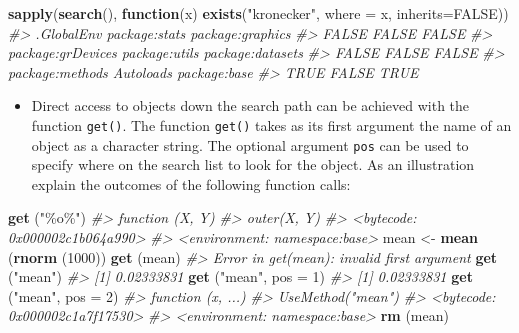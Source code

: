 \documentclass[
]{book}
\newenvironment{Shaded}{\begin{snugshade}}{\end{snugshade}}
\newcommand{\AttributeTok}[1]{\textcolor[rgb]{0.13,0.29,0.53}{#1}}
\newcommand{\CommentTok}[1]{\textcolor[rgb]{0.56,0.35,0.01}{\textit{#1}}}
\newcommand{\ConstantTok}[1]{\textcolor[rgb]{0.56,0.35,0.01}{#1}}
\newcommand{\ControlFlowTok}[1]{\textcolor[rgb]{0.13,0.29,0.53}{\textbf{#1}}}
\newcommand{\DecValTok}[1]{\textcolor[rgb]{0.00,0.00,0.81}{#1}}
\newcommand{\FunctionTok}[1]{\textcolor[rgb]{0.13,0.29,0.53}{\textbf{#1}}}
\newcommand{\NormalTok}[1]{#1}
\newcommand{\OtherTok}[1]{\textcolor[rgb]{0.56,0.35,0.01}{#1}}
\newcommand{\StringTok}[1]{\textcolor[rgb]{0.31,0.60,0.02}{#1}}
\providecommand{\tightlist}{%
  \setlength{\itemsep}{0pt}\setlength{\parskip}{0pt}}
\begin{document}
\begin{Shaded}
\begin{Highlighting}[]
\FunctionTok{sapply}\NormalTok{(}\FunctionTok{search}\NormalTok{(), }\ControlFlowTok{function}\NormalTok{(x) }\FunctionTok{exists}\NormalTok{(}\StringTok{"kronecker"}\NormalTok{, }\AttributeTok{where =}\NormalTok{ x, }\AttributeTok{inherits=}\ConstantTok{FALSE}\NormalTok{))}
\CommentTok{\#\textgreater{}        .GlobalEnv     package:stats  package:graphics }
\CommentTok{\#\textgreater{}             FALSE             FALSE             FALSE }
\CommentTok{\#\textgreater{} package:grDevices     package:utils  package:datasets }
\CommentTok{\#\textgreater{}             FALSE             FALSE             FALSE }
\CommentTok{\#\textgreater{}   package:methods         Autoloads      package:base }
\CommentTok{\#\textgreater{}              TRUE             FALSE              TRUE}
\end{Highlighting}
\end{Shaded}

\begin{itemize}
\tightlist
\item
  Direct access to objects down the search path can be achieved with the function \texttt{get()}.
  The function \texttt{get()} takes as its first argument the name of an object as a character string. The optional argument \texttt{pos} can be used to specify where on the search list to look for the object. As an illustration explain the outcomes of the following function calls:
\end{itemize}

\begin{Shaded}
\begin{Highlighting}[]
\FunctionTok{get}\NormalTok{ (}\StringTok{"\%o\%"}\NormalTok{) }
\CommentTok{\#\textgreater{} function (X, Y) }
\CommentTok{\#\textgreater{} outer(X, Y)}
\CommentTok{\#\textgreater{} \textless{}bytecode: 0x000002c1b064a990\textgreater{}}
\CommentTok{\#\textgreater{} \textless{}environment: namespace:base\textgreater{}}
\NormalTok{mean }\OtherTok{\textless{}{-}} \FunctionTok{mean}\NormalTok{ (}\FunctionTok{rnorm}\NormalTok{ (}\DecValTok{1000}\NormalTok{))}
\FunctionTok{get}\NormalTok{ (mean)}
\CommentTok{\#\textgreater{} Error in get(mean): invalid first argument}
\FunctionTok{get}\NormalTok{ (}\StringTok{"mean"}\NormalTok{) }
\CommentTok{\#\textgreater{} [1] 0.02333831}
\FunctionTok{get}\NormalTok{ (}\StringTok{"mean"}\NormalTok{, }\AttributeTok{pos =} \DecValTok{1}\NormalTok{) }
\CommentTok{\#\textgreater{} [1] 0.02333831}
\FunctionTok{get}\NormalTok{ (}\StringTok{"mean"}\NormalTok{, }\AttributeTok{pos =} \DecValTok{2}\NormalTok{)}
\CommentTok{\#\textgreater{} function (x, ...) }
\CommentTok{\#\textgreater{} UseMethod("mean")}
\CommentTok{\#\textgreater{} \textless{}bytecode: 0x000002c1a7f17530\textgreater{}}
\CommentTok{\#\textgreater{} \textless{}environment: namespace:base\textgreater{}}
\FunctionTok{rm}\NormalTok{ (mean)}
\end{Highlighting}
\end{Shaded}
\end{document}
